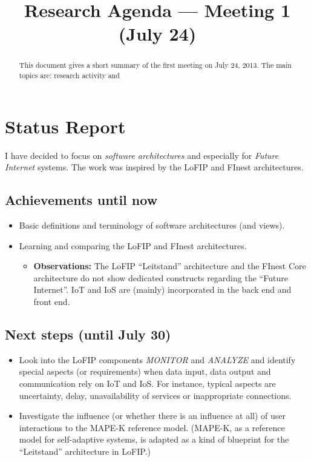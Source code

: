 \documentclass{llncs} %
\begin{document}
\title{Research Agenda --- Meeting 1 (July 24)}
 

\maketitle

\begin{abstract}
This document gives a short summary of the first meeting on
July 24, 2013.
The main topics are: research activity and 
\end{abstract}


\section{Status Report}

I have decided to focus on \emph{software architectures} and especially
for \emph{Future Internet} systems.
The work was inspired by the LoFIP and FInest architectures.

\subsection{Achievements until now}

\begin{itemize}
	\item Basic definitions and terminology of software architectures (and views).
	\item Learning and comparing the LoFIP and FInest architectures.
	   \begin{itemize}
			 \item \textbf{Observations:} The LoFIP ``Leitstand'' architecture
			       and the FInest Core architecture do not show dedicated
						 constructs regarding the ``Future Internet''. 
						 IoT and IoS are (mainly) incorporated in the back end and front end.
		 \end{itemize}
\end{itemize}


\subsection{Next steps (until July 30)}

\begin{itemize}
	\item Look into the LoFIP components \emph{MONITOR} and \emph{ANALYZE} and
	  identify special aspects (or requirements) when data input, data output
		 and communication rely on IoT and IoS.
		For instance, typical aspects are uncertainty, delay, unavailability of services
		or inappropriate connections.
	\item Investigate the influence (or whether there is an influence at all) of user interactions
	   to the MAPE-K reference model. (MAPE-K, as a reference model for self-adaptive systems,
		 is adapted as a kind of blueprint for the ``Leitstand'' architecture in LoFIP.)
\end{itemize}
\end{document}
